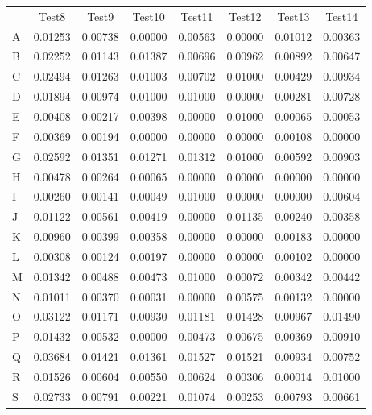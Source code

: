 \begin{tabularx}{\textwidth}{X|c|c|c|c|c|c|c}
 & Test8 & Test9 & Test10 & Test11 & Test12 & Test13 & Test14 \\%
A & 0.01253 &  0.00738 &  0.00000 &  0.00563 &  0.00000 &  0.01012 &  0.00363 \\
B & 0.02252 &  0.01143 &  0.01387 &  0.00696 &  0.00962 &  0.00892 &  0.00647 \\
C & 0.02494 &  0.01263 &  0.01003 &  0.00702 &  0.01000 &  0.00429 &  0.00934 \\
D & 0.01894 &  0.00974 &  0.01000 &  0.01000 &  0.00000 &  0.00281 &  0.00728 \\
E & 0.00408 &  0.00217 &  0.00398 &  0.00000 &  0.01000 &  0.00065 &  0.00053 \\
F & 0.00369 &  0.00194 &  0.00000 &  0.00000 &  0.00000 &  0.00108 &  0.00000 \\
G & 0.02592 &  0.01351 &  0.01271 &  0.01312 &  0.01000 &  0.00592 &  0.00903 \\
H & 0.00478 &  0.00264 &  0.00065 &  0.00000 &  0.00000 &  0.00000 &  0.00000 \\
I & 0.00260 &  0.00141 &  0.00049 &  0.01000 &  0.00000 &  0.00000 &  0.00604 \\
J & 0.01122 &  0.00561 &  0.00419 &  0.00000 &  0.01135 &  0.00240 &  0.00358 \\
K & 0.00960 &  0.00399 &  0.00358 &  0.00000 &  0.00000 &  0.00183 &  0.00000 \\
L & 0.00308 &  0.00124 &  0.00197 &  0.00000 &  0.00000 &  0.00102 &  0.00000 \\
M & 0.01342 &  0.00488 &  0.00473 &  0.01000 &  0.00072 &  0.00342 &  0.00442 \\
N & 0.01011 &  0.00370 &  0.00031 &  0.00000 &  0.00575 &  0.00132 &  0.00000 \\
O & 0.03122 &  0.01171 &  0.00930 &  0.01181 &  0.01428 &  0.00967 &  0.01490 \\
P & 0.01432 &  0.00532 &  0.00000 &  0.00473 &  0.00675 &  0.00369 &  0.00910 \\
Q & 0.03684 &  0.01421 &  0.01361 &  0.01527 &  0.01521 &  0.00934 &  0.00752 \\
R & 0.01526 &  0.00604 &  0.00550 &  0.00624 &  0.00306 &  0.00014 &  0.01000 \\
S & 0.02733 &  0.00791 &  0.00221 &  0.01074 &  0.00253 &  0.00793 &  0.00661 \\

\end{tabularx}
